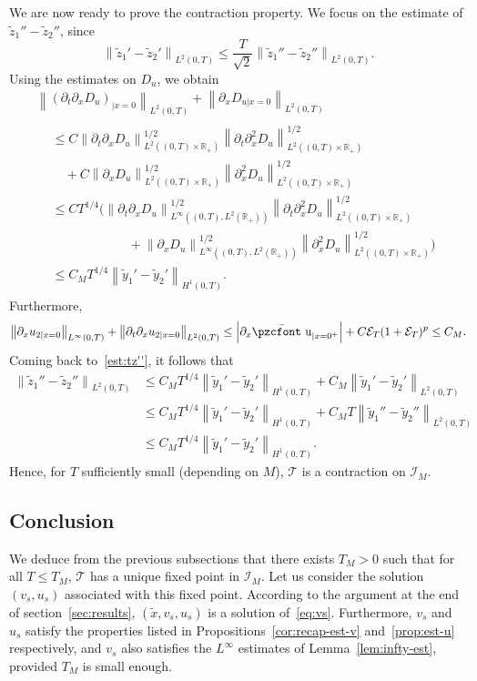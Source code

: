 \documentclass[10pt]{amsart}
\theoremstyle{definition}\newtheorem{defi}[theo]{Definition}\newtheorem{rema}[theo]{Remark}\newtheorem{exam}[theo]{Example}\newtheorem{exem}[theo]{Example}\newtheorem{nota}[theo]{Notation}
\newcommand{\mathpzc}[1]{\text{\pzcfont #1}}
\newcommand{\R}{\mathbb{R}}
\newcommand{\p}{\partial}
\newcommand{\bu}{\bar{\mathpzc{u}}}
\newcommand{\cE}{\mathcal E}
\newcommand{\cT}{\mathcal T}
\newcommand{\cI}{\mathcal I}
\newcommand{\tx}{\widetilde{x}}
\newcommand{\ty}{\widetilde{y}}
\newcommand{\tz}{\widetilde{z}}
\newcommand{\du}{D_u}
\begin{document}
We are now ready to prove the contraction property. We focus on the estimate of $\tz_1''-\tz_2''$, since
\[
\left\|\tz_1'-\tz_2'\right\|_{L^2(0,T)}\leq \frac{T}{\sqrt{2}}\left\|\tz_1''-\tz_2''\right\|_{L^2(0,T)}.
\]
Using the estimates on $\du$, we obtain
\begin{multline*}
\left\|\left(\p_t \p_x \du\right)_{|x=0}\right\|_{L^2(0,T)} + \left\| \p_x D_{u|x=0}\right\|_{L^2(0,T)}\\
\begin{aligned}
&\leq C\left\|\p_t \p_x \du\right\|_{L^2\left((0,T)\times \R_+\right) }^{1/2} \left\|\p_t \p_x^2 \du\right\|_{L^2\left((0,T)\times \R_+\right)}^{1/2} 
\\
&\quad + C \left\| \p_x \du\right\|_{L^2\left((0,T)\times \R_+\right)}^{1/2}\left\| \p_x^2 \du\right\|_{L^2\left((0,T)\times \R_+\right)}^{1/2} \\
&\leq CT^{1/4} \Big(\left\|\p_t \p_x \du\right\|_{L^\infty\left((0,T), L^2(\R_+)\right)}^{1/2} \left\|\p_t \p_x^2 \du\right\|_{L^2\left((0,T)\times \R_+\right)}^{1/2}\\
&\qquad\qquad\qquad + \left\| \p_x \du\right\|_{L^\infty\left((0,T), L^2(\R_+)\right)}^{1/2}\left\| \p_x^2 \du\right\|_{L^2\left((0,T)\times \R_+\right)}^{1/2} \Big)\\
&\leq C_M T^{1/4} \left\|\ty_1'-\ty_2'\right\|_{H^1(0,T)}.
\end{aligned}
\end{multline*}
Furthermore,
\[
\left\|\p_x u_{2|x=0}\right\|_{L^\infty(0,T)} + \left\|\p_t \p_x u_{2|x=0}\right\|_{L^2(0,T)}
\leq \left|\p_x \bu_{|x=0^+}\right| + C\cE_T (1 + \cE_T)^p
\leq C_M.
\]
Coming back to~\eqref{est:tz''}, it follows that
\begin{align*}
\left\|\tz_1''-\tz_2''\right\|_{L^2(0,T)} & \leq C_M T^{1/4}\left\|\ty_1'-\ty_2'\right\|_{H^1(0,T)} + C_M \left\|\ty_1'-\ty_2'\right\|_{L^2(0,T)} \\
& \leq C_M T^{1/4}\left\|\ty_1'-\ty_2'\right\|_{H^1(0,T)} + C_M T \left\|\ty_1''-\ty_2''\right\|_{L^2(0,T)} \\
& \leq C_M T^{1/4}\left\|\ty_1'-\ty_2'\right\|_{H^1(0,T)}.
\end{align*}
Hence, for $T$ sufficiently small (depending on $M$), $\cT$ is a contraction on $\cI_M$.

\subsection{Conclusion}

We deduce from the previous subsections that there exists $T_M>0$ such that for all $T\leq T_M$, $\cT$ has a unique fixed point in $\cI_M$. Let us consider the solution $(v_s, u_s)$ associated with this fixed point. According to the argument at the end of section~\ref{sec:results}, $(\tx, v_s, u_s)$ is a solution of~\eqref{eq:vs}. Furthermore, $v_s$ and $u_s$ satisfy the properties listed in Propositions~\ref{cor:recap-est-v} and~\ref{prop:est-u} respectively, and $v_s$ also satisfies the $L^\infty$ estimates of Lemma~\ref{lem:infty-est}, provided $T_M$ is small enough.
\end{document}
